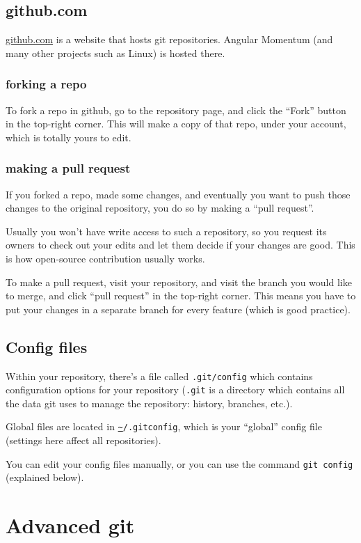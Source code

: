 \documentclass[12pt]{article}
\newcommand{\urlwofont}[1]{\urlstyle{same}\url{#1}}
\begin{document}
\subsection{github.com}
\url{github.com} is a website that hosts git repositories. Angular Momentum (and many other projects such as Linux) is hosted there.

\subsubsection{forking a repo}
To fork a repo in github, go to the repository page, and click the ``Fork'' button in the top-right corner. This will make a copy of that repo, under your account, which is totally yours to edit.

\subsubsection{making a pull request}
If you forked a repo, made some changes, and eventually you want to push those changes to the original repository, you do so by making a ``pull request''.

Usually you won't have write access to such a repository, so you request its owners to check out your edits and let them decide if your changes are good. This is how open-source contribution usually works.

To make a pull request, visit your repository, and visit the branch you would like to merge, and click ``pull request'' in the top-right corner. This means you have to put your changes in a separate branch for every feature (which is good practice).

\subsection{Config files}
Within your repository, there's a file called \texttt{.git/config} which contains configuration options for your repository (\texttt{.git} is a directory which contains all the data git uses to manage the repository: history, branches, etc.).

Global files are located in \texttt{\urlwofont{~}/.gitconfig}, which is your ``global'' config file (settings here affect all repositories).

You can edit your config files manually, or you can use the command \texttt{git config} (explained below).

\section{Advanced git}
\end{document}
